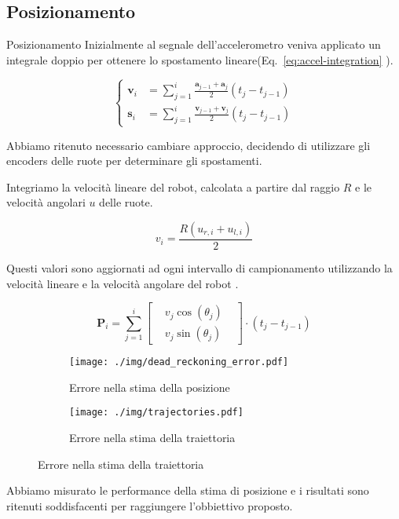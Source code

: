 \documentclass[10pt]{beamer}
\begin{document}
	\subsection{Posizionamento}\label{subsec:Posizionamento}
	\begin{frame}{Posizionamento}
		Inizialmente al segnale dell'accelerometro
		veniva applicato un integrale doppio per ottenere lo spostamento
		lineare(Eq.~\ref{eq:accel-integration} 	\cite{positioning}).
		
		\begin{equation}\label{eq:accel-integration}
			\begin{cases}
				\textbf{v}_i & = \sum_{j=1}^{i} \frac{\textbf{a} _{j-1}+\textbf{a} _j}{2} \left( t_j-t_{j-1} \right) \\
				\textbf{s}_i & = \sum_{j=1}^{i} \frac{\textbf{v} _{j-1}+\textbf{v} _j}{2} \left( t_j-t_{j-1} \right) 
			\end{cases}
		\end{equation}
		
		\pause
		Abbiamo ritenuto necessario cambiare approccio, decidendo di utilizzare
		gli encoders delle ruote per determinare gli spostamenti. 
		
		Integriamo la velocità lineare del robot, calcolata a partire dal
		raggio $R$ e le velocità angolari $u$ delle ruote.
		
		\begin{equation}\label{eq:linear-velocity}
			v_i = \frac{R (u_{r,i}+u_{l,i})}{2}
		\end{equation}
		
		\pause
		Questi valori sono aggiornati ad ogni intervallo di campionamento utilizzando la velocità lineare e la velocità angolare del robot \cite{572228}.
		
		\begin{equation}\label{eq:position-vector-update}
			\textbf{P}_i = \sum_{j = 1}^{i} \begin{bmatrix}
				 & v_j\cos(\theta_j ) & \\
				 & v_j\sin(\theta_j )
			\end{bmatrix}\cdot (t_j-t_{j-1}) 
		\end{equation}		
		
	\end{frame}
	\begin{frame}
		\begin{figure}[H]
			\begin{subfigure}{0.49\textwidth}
				\centering
				\texttt{[image: ./img/dead\_reckoning\_error.pdf]}
				\caption{Errore nella stima della posizione}
				\label{fig:dead_reckoning_error}
			\end{subfigure}
			\begin{subfigure}{0.49\textwidth}
				\centering
				\texttt{[image: ./img/trajectories.pdf]}
				\caption{Errore nella stima della traiettoria}
				\label{fig:trajectory_error}
			\end{subfigure}
		\end{figure}
		Abbiamo misurato le performance della stima di posizione e i risultati
		sono ritenuti soddisfacenti per raggiungere l'obbiettivo proposto.
	\end{frame}
	
\end{document}
